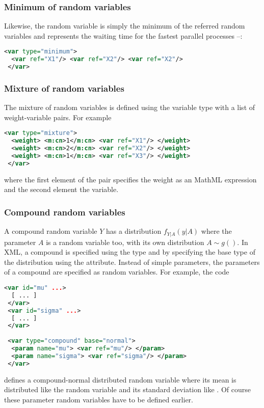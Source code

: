 \subsubsection{Minimum of random variables}
Likewise, the  random variable is simply the minimum of the referred random
variables and represents the waiting time for the fastest parallel processes --:
\begin{lstlisting}[language=XML]
 <var type="minimum">
  <var ref="X1"/> <var ref="X2"/> <var ref="X2"/>
 </var>
\end{lstlisting}

\subsubsection{Mixture of random variables}
The mixture of random variables is defined using the  variable type with a list of
weight-variable pairs. For example
\begin{lstlisting}[language=XML]
 <var type="mixture">
  <weight> <m:cn>1</m:cn> <var ref="X1"/> </weight>
  <weight> <m:cn>2</m:cn> <var ref="X2"/> </weight>
  <weight> <m:cn>1</m:cn> <var ref="X3"/> </weight>
 </var>
\end{lstlisting}
where the first element of the  pair specifies the weight as an MathML expression
and the second element the variable.

\subsubsection{Compound random variables} 
A compound random variable $Y$ has a distribution $f_{Y|A}(y|A)$ where the parameter $A$ is a random
variable too, with its own distribution $A\sim g()$. In XML, a compound is specified using the 
 type and by specifying the base type of the distribution using the  attribute.
Instead of simple parameters, the parameters of a compound are specified as random variables. 
For example, the code
\begin{lstlisting}[language=XML]
 <var id="mu" ...>
  [ ... ]
 </var>
 <var id="sigma" ...>
  [ ... ]
 </var>
 
 <var type="compound" base="normal">
  <param name="mu"> <var ref="mu"/> </param>
  <param name="sigma"> <var ref="sigma"/> </param>
 </var>
\end{lstlisting}
defines a compound-normal distributed random variable where its mean is distributed like the random 
variable  and its standard deviation like . Of course these parameter random 
variables have to be defined earlier.

